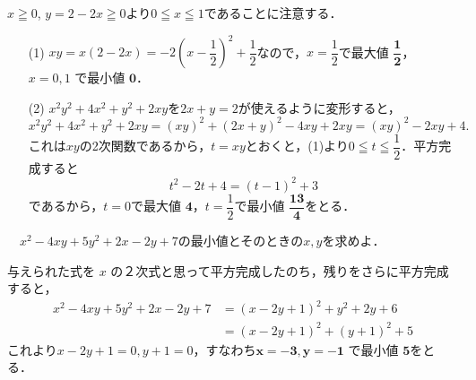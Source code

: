 \documentclass[a4paper,11pt]{ltjsarticle}
\begin{document}
\ans 
$x \geqq 0$, $y =2-2x\geqq 0$より$0 \leqq x \leqq 1$であることに注意する．
\begin{itemize}
    \item [(1)]$xy = x(2-2x) = -2\left(x-\dfrac{1}{2}\right)^2+\dfrac{1}{2}$なので，$x=\dfrac{1}{2}$で最大値 $\boldsymbol{\dfrac{1}{2}}$， $x=0, 1$ で最小値 $\boldsymbol{0}$．
\item[(2)] $x^2y^2+4x^2+y^2+2xy$を$2x+y=2$が使えるように変形すると，
\[x^2y^2+4x^2+y^2+2xy=(xy)^2+(2x+y)^2-4xy+2xy=(xy)^2-2xy+4.\]
これは$xy$の2次関数であるから，$t=xy$とおくと，(1)より$0\leqq t\leqq \dfrac12$．平方完成すると
\[t^2-2t+4=(t-1)^2+3\]
であるから，$t=0$で最大値 $\boldsymbol{4}$，$t=\dfrac12$で最小値 $\boldsymbol{\dfrac{13}{4}}$をとる．
\end{itemize}
\begin{toi}
　$x^2-4xy+5y^2+2x-2y+7$の最小値とそのときの$x,y$を求めよ．
\end{toi}
\ans 与えられた式を $x$ の２次式と思って平方完成したのち，残りをさらに平方完成すると，
\begin{align*}
    x^2 - 4xy + 5y^2 + 2x - 2y + 7 &= (x-2y+1)^2 + y^2 + 2y + 6\\
    &= (x-2y+1)^2 + (y+1)^2 + 5 
\end{align*}
これより$x-2y+1=0, y+1=0$，すなわち$\boldsymbol{x=-3, y=-1}$ で最小値 $\boldsymbol{5}$をとる．
\end{document}
